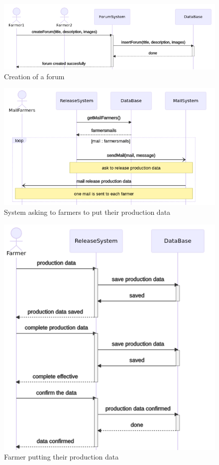 \begin{figure} [!h]
	\centering
	\includegraphics[width=\textwidth]{Images/seq_forum_creation.png}
	\caption{\label{fig:seq_crea_forum} Creation of a forum}
\end{figure}

\begin{figure} [!h]
	\centering
	\includegraphics[width=\textwidth]{Images/seq_asking_prod_data.png}
	\caption{\label{fig:seq_asking_proddata} System asking to farmers to put their production data}
\end{figure}

\begin{figure} [!h]
	\centering
	\includegraphics[width=\textwidth]{Images/seq_request_prod_data.png}
	\caption{\label{fig:seq_request_prod_data} Farmer putting their production data}
\end{figure}